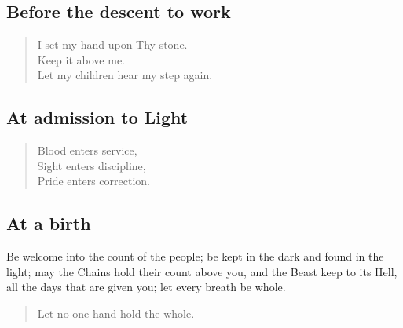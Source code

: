 \subsection*{Before the descent to work}

\begin{verse}
I set my hand upon Thy stone.\\
Keep it above me.\\
Let my children hear my step again.
\end{verse}

\subsection*{At admission to Light}

\begin{verse}
Blood enters service,\\
Sight enters discipline,\\
Pride enters correction.
\end{verse}

\subsection*{At a birth}

Be welcome into the count of the people; be kept in the dark and found in the light; may the Chains hold their count above you, and the Beast keep to its Hell, all the days that are given you; let every breath be whole.

\begin{verse}
Let no one hand hold the whole.
\end{verse}

